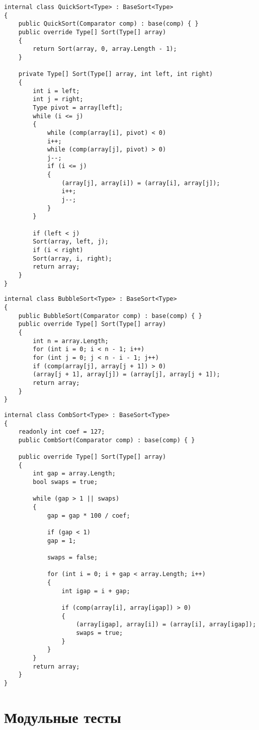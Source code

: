 \begin{lstlisting}[label=lst:quick,caption=Класс быстрой сортировки]
internal class QuickSort<Type> : BaseSort<Type>
{
	public QuickSort(Comparator comp) : base(comp) { }
	public override Type[] Sort(Type[] array) 
	{
		return Sort(array, 0, array.Length - 1);
	}
	
	private Type[] Sort(Type[] array, int left, int right)
	{
		int i = left;
		int j = right;
		Type pivot = array[left];
		while (i <= j)
		{
			while (comp(array[i], pivot) < 0)
			i++;
			while (comp(array[j], pivot) > 0)
			j--;
			if (i <= j)
			{
				(array[j], array[i]) = (array[i], array[j]);
				i++;
				j--;
			}
		}
		
		if (left < j)
		Sort(array, left, j);
		if (i < right)
		Sort(array, i, right);
		return array;
	}
}
\end{lstlisting}

\begin{lstlisting}[label=lst:bubble,caption= Класс сортировки пузырьком]
internal class BubbleSort<Type> : BaseSort<Type>
{
	public BubbleSort(Comparator comp) : base(comp) { }
	public override Type[] Sort(Type[] array)
	{
		int n = array.Length;
		for (int i = 0; i < n - 1; i++)
		for (int j = 0; j < n - i - 1; j++)
		if (comp(array[j], array[j + 1]) > 0)
		(array[j + 1], array[j]) = (array[j], array[j + 1]);
		return array;
	}
}
\end{lstlisting}

\begin{lstlisting}[label=lst:comb,caption=Класс сортировки расческой]
internal class CombSort<Type> : BaseSort<Type>
{
	readonly int coef = 127;
	public CombSort(Comparator comp) : base(comp) { }
	
	public override Type[] Sort(Type[] array)
	{
		int gap = array.Length;
		bool swaps = true;
		
		while (gap > 1 || swaps)
		{
			gap = gap * 100 / coef;
			
			if (gap < 1)
			gap = 1;
			
			swaps = false;
			
			for (int i = 0; i + gap < array.Length; i++)
			{
				int igap = i + gap;
				
				if (comp(array[i], array[igap]) > 0)
				{
					(array[igap], array[i]) = (array[i], array[igap]);
					swaps = true;
				}
			}
		}
		return array;
	}
}
\end{lstlisting}

\section{Модульные тесты}

